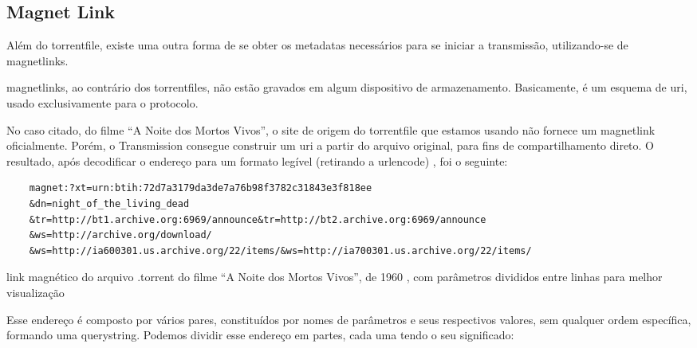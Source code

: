 
\subsection*{Magnet Link}

Além do \gls*{torrentfile}, existe uma outra forma de se obter os \glspl*{metadata}
necessários para se iniciar a transmissão, utilizando-se de \glspl{magnetlink}.

\newpage
\Glspl*{magnetlink}, ao contrário dos \glspl*{torrentfile}, não estão gravados em
algum dispositivo de armazenamento. Basicamente, é um esquema de \gls{uri}, usado
exclusivamente para o protocolo.

No caso citado, do filme \enquote{A Noite dos Mortos Vivos}, o site de origem do
\gls*{torrentfile} que estamos usando não fornece um \gls*{magnetlink} oficialmente.
Porém, o Transmission consegue construir um \gls*{uri} a partir do arquivo original,
para fins de compartilhamento direto. O resultado, após decodificar o endereço para um
formato legível (retirando a \gls{urlencode}) \cite{wiki:urlencode}, foi o seguinte:

\begin{listing}[ht!]
    \begin{verbatim}
    magnet:?xt=urn:btih:72d7a3179da3de7a76b98f3782c31843e3f818ee
    &dn=night_of_the_living_dead
    &tr=http://bt1.archive.org:6969/announce&tr=http://bt2.archive.org:6969/announce
    &ws=http://archive.org/download/
    &ws=http://ia600301.us.archive.org/22/items/&ws=http://ia700301.us.archive.org/22/items/
    \end{verbatim}
    \caption{link magnético do arquivo .torrent do filme
    \enquote{A Noite dos Mortos Vivos}, de 1960 \cite{torrent-file}, com parâmetros
    divididos entre linhas para melhor visualização}
    \label{lst:torrent-file-magnet-link}
\end{listing}

Esse endereço é composto por vários pares, constituídos por nomes de parâmetros e seus
respectivos valores, sem qualquer ordem específica, formando uma \gls{querystring}.
Podemos dividir esse endereço em partes, cada uma tendo o seu significado:

